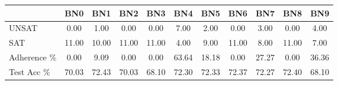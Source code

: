 \begin{tabular}{l|cccccccccc}
\toprule
 & BN0 & BN1 & BN2 & BN3 & BN4 & BN5 & BN6 & BN7 & BN8 & BN9 \\
\midrule
UNSAT & 0.00 & 1.00 & 0.00 & 0.00 & 7.00 & 2.00 & 0.00 & 3.00 & 0.00 & 4.00 \\
SAT & 11.00 & 10.00 & 11.00 & 11.00 & 4.00 & 9.00 & 11.00 & 8.00 & 11.00 & 7.00 \\
Adherence \% & 0.00 & 9.09 & 0.00 & 0.00 & 63.64 & 18.18 & 0.00 & 27.27 & 0.00 & 36.36 \\
Test Acc \% & 70.03 & 72.43 & 70.03 & 68.10 & 72.30 & 72.33 & 72.37 & 72.27 & 72.40 & 68.10 \\
\bottomrule
\end{tabular}
